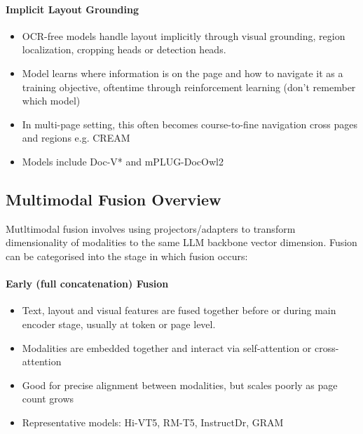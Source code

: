 \documentclass[11pt]{article}
\begin{document}
\paragraph{Implicit Layout Grounding}
\begin{itemize}
    \item OCR-free models handle layout implicitly through visual grounding, region localization, cropping heads or detection heads.
    \item Model learns where information is on the page and how to navigate it as a training objective, oftentime through reinforcement learning (don't remember which model)
    \item In multi-page setting, this often becomes course-to-fine navigation cross pages and regions e.g. CREAM
    \item Models include Doc-V* and mPLUG-DocOwl2
\end{itemize}

\subsection{Multimodal Fusion Overview}
Mutltimodal fusion involves using projectors/adapters to transform dimensionality of modalities to the same LLM backbone vector dimension. Fusion can be categorised into the stage in which fusion occurs:

\paragraph{Early (full concatenation) Fusion}
\begin{itemize}
    \item Text, layout and visual features are fused together before or during main encoder stage, usually at token or page level.
    \item Modalities are embedded together and interact via self-attention or cross-attention
    \item Good for precise alignment between modalities, but scales poorly as page count grows
    \item Representative models: Hi-VT5, RM-T5, InstructDr, GRAM
\end{itemize}
\end{document}
